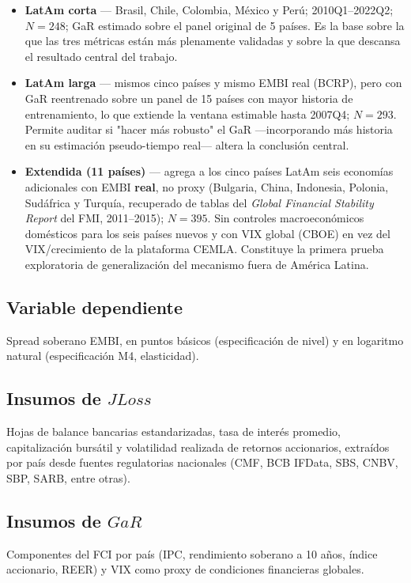 \documentclass[5p,times,twocolumn,authoryear]{elsarticle}
\begin{document}
\begin{itemize}
    \item \textbf{LatAm corta} — Brasil, Chile, Colombia, México y Perú; 2010Q1–2022Q2; $N=248$; GaR estimado sobre el panel original de 5 países. Es la base sobre la que las tres métricas están más plenamente validadas y sobre la que descansa el resultado central del trabajo.
    \item \textbf{LatAm larga} — mismos cinco países y mismo EMBI real (BCRP), pero con GaR reentrenado sobre un panel de 15 países con mayor historia de entrenamiento, lo que extiende la ventana estimable hasta 2007Q4; $N=293$. Permite auditar si "hacer más robusto" el GaR —incorporando más historia en su estimación pseudo-tiempo real— altera la conclusión central.
    \item \textbf{Extendida (11 países)} — agrega a los cinco países LatAm seis economías adicionales con EMBI \textbf{real}, no proxy (Bulgaria, China, Indonesia, Polonia, Sudáfrica y Turquía, recuperado de tablas del \textit{Global Financial Stability Report} del FMI, 2011–2015); $N=395$. Sin controles macroeconómicos domésticos para los seis países nuevos y con VIX global (CBOE) en vez del VIX/crecimiento de la plataforma CEMLA. Constituye la primera prueba exploratoria de generalización del mecanismo fuera de América Latina.
\end{itemize}

\subsection{Variable dependiente}
Spread soberano EMBI, en puntos básicos (especificación de nivel) y en logaritmo natural (especificación M4, elasticidad).

\subsection{Insumos de $JLoss$}
Hojas de balance bancarias estandarizadas, tasa de interés promedio, capitalización bursátil y volatilidad realizada de retornos accionarios, extraídos por país desde fuentes regulatorias nacionales (CMF, BCB IFData, SBS, CNBV, SBP, SARB, entre otras).

\subsection{Insumos de $GaR$}
Componentes del FCI por país (IPC, rendimiento soberano a 10 años, índice accionario, REER) y VIX como proxy de condiciones financieras globales.
\end{document}
